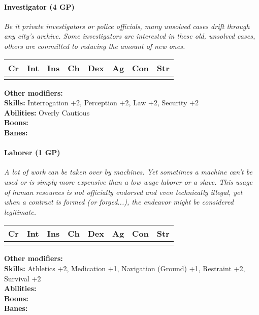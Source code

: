 \paragraph*{Investigator (4 GP)}
\textit{Be it private investigators or police officials, many unsolved cases drift through any city's archive. Some investigators are interested in these old, unsolved cases, others are committed to reducing the amount of new ones.}\par
\begin{tabular}{|l|l|l|l|l|l|l|l|}
	\hline
	Cr & Int & Ins & Ch & Dex & Ag & Con & Str \\ \hline
	&  &  &  &  &  &  &  \\ \hline
\end{tabular}\par
\noindent\textbf{Other modifiers:} \\
\textbf{Skills:} Interrogation +2,
Perception +2,
Law +2,
Security +2\\
\textbf{Abilities:} Overly Cautious\\
\textbf{Boons:} \\
\textbf{Banes:} \\

\hrulefill
\paragraph*{Laborer (1 GP)}
\textit{A lot of work can be taken over by machines. Yet sometimes a machine can't be used or is simply more expensive than a low wage laborer or a slave. This usage of human resources is not officially endorsed and even technically illegal, yet when a contract is formed (or forged...), the endeavor might be considered legitimate.}\par
\begin{tabular}{|l|l|l|l|l|l|l|l|}
	\hline
	Cr & Int & Ins & Ch & Dex & Ag & Con & Str \\ \hline
	&  &  &  &  &  &  &  \\ \hline
\end{tabular}\par
\noindent\textbf{Other modifiers:} \\
\textbf{Skills:} Athletics +2,
Medication +1,
Navigation (Ground) +1,
Restraint +2,
Survival +2\\
\textbf{Abilities:} \\
\textbf{Boons:} \\
\textbf{Banes:} \\

